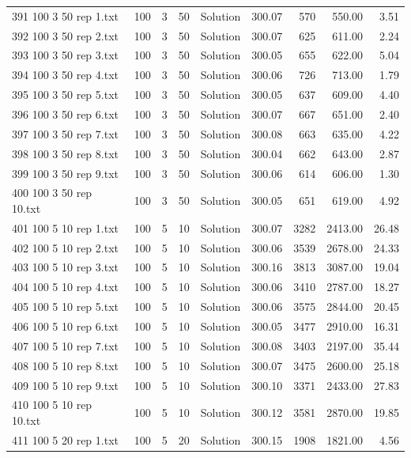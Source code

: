 \begin{longtable}{lrrllrrrr}
391 100 3 50 rep 1.txt & 100 & 3 & 50 & Solution & 300.07 & 570 & 550.00 &  3.51\\
392 100 3 50 rep 2.txt & 100 & 3 & 50 & Solution & 300.07 & 625 & 611.00 &  2.24\\
393 100 3 50 rep 3.txt & 100 & 3 & 50 & Solution & 300.05 & 655 & 622.00 &  5.04\\
394 100 3 50 rep 4.txt & 100 & 3 & 50 & Solution & 300.06 & 726 & 713.00 &  1.79\\
395 100 3 50 rep 5.txt & 100 & 3 & 50 & Solution & 300.05 & 637 & 609.00 &  4.40\\
396 100 3 50 rep 6.txt & 100 & 3 & 50 & Solution & 300.07 & 667 & 651.00 &  2.40\\
397 100 3 50 rep 7.txt & 100 & 3 & 50 & Solution & 300.08 & 663 & 635.00 &  4.22\\
398 100 3 50 rep 8.txt & 100 & 3 & 50 & Solution & 300.04 & 662 & 643.00 &  2.87\\
399 100 3 50 rep 9.txt & 100 & 3 & 50 & Solution & 300.06 & 614 & 606.00 &  1.30\\
400 100 3 50 rep 10.txt & 100 & 3 & 50 & Solution & 300.05 & 651 & 619.00 &  4.92\\
401 100 5 10 rep 1.txt & 100 & 5 & 10 & Solution & 300.07 & 3282 & 2413.00 & 26.48\\
402 100 5 10 rep 2.txt & 100 & 5 & 10 & Solution & 300.06 & 3539 & 2678.00 & 24.33\\
403 100 5 10 rep 3.txt & 100 & 5 & 10 & Solution & 300.16 & 3813 & 3087.00 & 19.04\\
404 100 5 10 rep 4.txt & 100 & 5 & 10 & Solution & 300.06 & 3410 & 2787.00 & 18.27\\
405 100 5 10 rep 5.txt & 100 & 5 & 10 & Solution & 300.06 & 3575 & 2844.00 & 20.45\\
406 100 5 10 rep 6.txt & 100 & 5 & 10 & Solution & 300.05 & 3477 & 2910.00 & 16.31\\
407 100 5 10 rep 7.txt & 100 & 5 & 10 & Solution & 300.08 & 3403 & 2197.00 & 35.44\\
408 100 5 10 rep 8.txt & 100 & 5 & 10 & Solution & 300.07 & 3475 & 2600.00 & 25.18\\
409 100 5 10 rep 9.txt & 100 & 5 & 10 & Solution & 300.10 & 3371 & 2433.00 & 27.83\\
410 100 5 10 rep 10.txt & 100 & 5 & 10 & Solution & 300.12 & 3581 & 2870.00 & 19.85\\
411 100 5 20 rep 1.txt & 100 & 5 & 20 & Solution & 300.15 & 1908 & 1821.00 &  4.56\\

\end{longtable}
